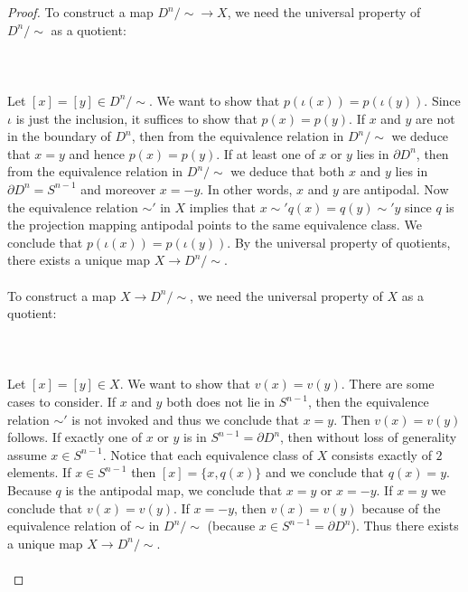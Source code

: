 \documentclass[a4paper]{article}
\begin{document}
\begin{prp}{}{}
\begin{proof}
To construct a map $D^n/\sim\to X$, we need the universal property of $D^n/\sim$ as a quotient: \\~\\
\\~\\
Let $[x]=[y]\in D^n/\sim$. We want to show that $p(\iota(x))=p(\iota(y))$. Since $\iota$ is just the inclusion, it suffices to show that $p(x)=p(y)$. If $x$ and $y$ are not in the boundary of $D^n$, then from the equivalence relation in $D^n/\sim$ we deduce that $x=y$ and hence $p(x)=p(y)$. If at least one of $x$ or $y$ lies in $\partial D^n$, then from the equivalence relation in $D^n/\sim$ we deduce that both $x$ and $y$ lies in $\partial D^n=S^{n-1}$ and moreover $x=-y$. In other words, $x$ and $y$ are antipodal. Now the equivalence relation $\sim'$ in $X$ implies that $x\sim' q(x)=q(y)\sim' y$ since $q$ is the projection mapping antipodal points to the same equivalence class. We conclude that $p(\iota(x))=p(\iota(y))$. By the universal property of quotients, there exists a unique map $X\to D^n/\sim$. \\~\\

To construct a map $X\to D^n/\sim$, we need the universal property of $X$ as a quotient: \\~\\
\\~\\
Let $[x]=[y]\in X$. We want to show that $v(x)=v(y)$. There are some cases to consider. If $x$ and $y$ both does not lie in $S^{n-1}$, then the equivalence relation $\sim'$ is not invoked and thus we conclude that $x=y$. Then $v(x)=v(y)$ follows. If exactly one of $x$ or $y$ is in $S^{n-1}=\partial D^n$, then without loss of generality assume $x\in S^{n-1}$. Notice that each equivalence class of $X$ consists exactly of $2$ elements. If $x\in S^{n-1}$ then $[x]=\{x,q(x)\}$ and we conclude that $q(x)=y$. Because $q$ is the antipodal map, we conclude that $x=y$ or $x=-y$. If $x=y$ we conclude that $v(x)=v(y)$. If $x=-y$, then $v(x)=v(y)$ because of the equivalence relation of $\sim$ in $D^n/\sim$ (because $x\in S^{n-1}=\partial D^n$). Thus there exists a unique map $X\to D^n/\sim$. \\~\\


\end{proof}
\end{prp}
\end{document}
